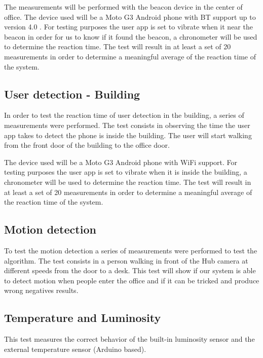 The measurements will be performed with the beacon device in the center of office. The device used will be a Moto G3 Android phone with BT support up to version 4.0 .
For testing purposes the user app is set to vibrate when it near the beacon in order for us to know if it found the beacon, a chronometer will be used to determine the reaction time. The test will result in at least a set of 20 measurements in order to determine a meaningful average of the reaction time of the system.


\subsection{User detection - Building}

In order to test the reaction time of user detection in the building, a series of measurements were performed. The test consists in observing the time the user app takes to detect the phone is inside the building. The user will start walking from the front door of the building to the office door.

The device used will be a Moto G3 Android phone with WiFi support.
For testing purposes the user app is set to vibrate when it is inside the building, a chronometer will be used to determine the reaction time. The test will result in at least a set of 20 measurements in order to determine a meaningful average of the reaction time of the system.



\subsection{Motion detection}

To test the motion detection a series of measurements were performed to test the algorithm. The test consists in a person walking in front of the Hub camera at different speeds from the door to a desk. This test will show if our system is able to detect motion when people enter the office and if it can be tricked and produce wrong negatives results.




\subsection{Temperature and Luminosity}

This test measures the correct behavior of the built-in luminosity sensor and the external temperature sensor (Arduino based). 


